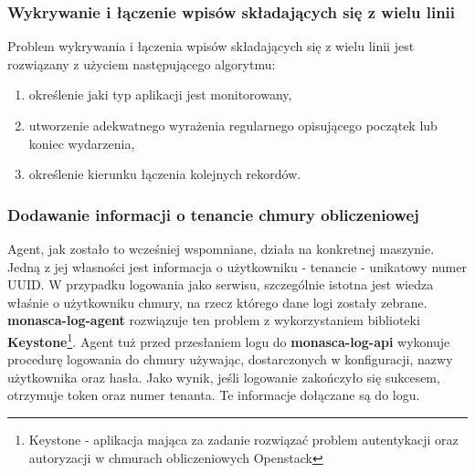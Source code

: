         \subsubsection{Wykrywanie i łączenie wpisów składających się z wielu linii}
            Problem wykrywania i łączenia wpisów składających się z wielu linii jest rozwiązany z użyciem następującego algorytmu:
            \begin{enumerate}
                \item określenie jaki typ aplikacji jest monitorowany,
                \item utworzenie adekwatnego wyrażenia regularnego opisującego początek lub koniec wydarzenia,
                \item określenie kierunku łączenia kolejnych rekordów.
            \end{enumerate}
            
            
        \subsubsection{Dodawanie informacji o tenancie chmury obliczeniowej}
            Agent, jak zostało to wcześniej wspomniane, działa na konkretnej maszynie. Jedną z jej własności jest
            informacja o użytkowniku - tenancie - unikatowy numer UUID. W przypadku logowania jako serwisu,
            szczególnie istotna jest wiedza właśnie o użytkowniku chmury, na rzecz którego dane logi zostały
            zebrane. \textbf{monasca-log-agent} rozwiązuje ten problem z wykorzystaniem biblioteki 
            \textbf{Keystone}\footnote{Keystone - aplikacja mająca za zadanie rozwiązać problem autentykacji oraz autoryzacji 
                w chmurach obliczeniowych Openstack}. 
            Agent tuż przed przesłaniem logu do \textbf{monasca-log-api} wykonuje procedurę logowania do chmury
            używając, dostarczonych w konfiguracji, nazwy użytkownika oraz hasła. Jako wynik, jeśli logowanie 
            zakończyło się sukcesem, otrzymuje token oraz numer tenanta. Te informacje dołączane są do logu.
            
